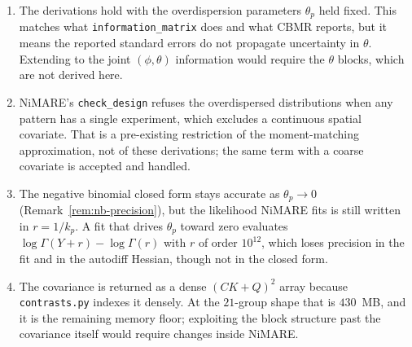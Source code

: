 \documentclass[11pt,a4paper]{article}
\theoremstyle{plain}
\theoremstyle{definition}
\begin{document}
\begin{enumerate}
  \item The derivations hold with the overdispersion parameters $\theta_p$ held fixed. This
        matches what \texttt{information\_matrix} does and what CBMR reports, but it means the
        reported standard errors do not propagate uncertainty in $\theta$. Extending to the joint
        $(\phi,\theta)$ information would require the $\theta$ blocks, which are not derived here.
  \item NiMARE's \texttt{check\_design} refuses the overdispersed distributions when any pattern
        has a single experiment, which excludes a continuous spatial covariate. That is a
        pre-existing restriction of the moment-matching approximation, not of these derivations;
        the same term with a coarse covariate is accepted and handled.
  \item The negative binomial closed form stays accurate as $\theta_p \to 0$
        (Remark~\ref{rem:nb-precision}), but the likelihood NiMARE fits is still written in
        $r = 1/k_p$. A fit that drives $\theta_p$ toward zero evaluates
        $\log\Gamma(Y+r) - \log\Gamma(r)$ with $r$ of order $10^{12}$, which loses precision in
        the fit and in the autodiff Hessian, though not in the closed form.
  \item The covariance is returned as a dense $(CK+Q)^2$ array because
        \texttt{contrasts.py} indexes it densely. At the $21$-group shape that is $430$~MB, and it
        is the remaining memory floor; exploiting the block structure past the covariance itself
        would require changes inside NiMARE.
\end{enumerate}

\clearpage

\end{document}

